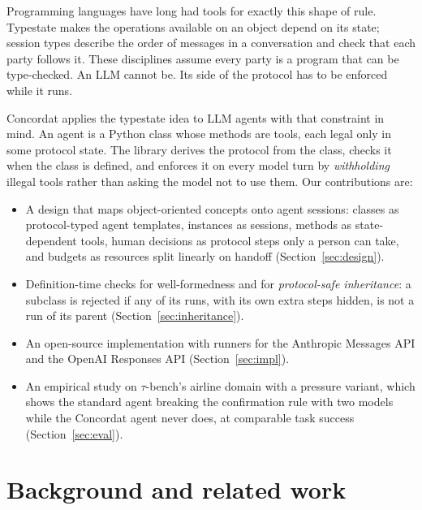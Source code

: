 \documentclass[11pt]{article}
\begin{document}
Programming languages have long had tools for exactly this shape of rule. Typestate
\citep{strom1986typestate} makes the operations available on an object depend on its
state; session types \citep{honda1993types,honda1998language,honda2008multiparty}
describe the order of messages in a conversation and check that each party follows it.
These disciplines assume every party is a program that can be type-checked. An LLM
cannot be. Its side of the protocol has to be enforced while it runs.

Concordat applies the typestate idea to LLM agents with that constraint in mind. An
agent is a Python class whose methods are tools, each legal only in some protocol
state. The library derives the protocol from the class, checks it when the class is
defined, and enforces it on every model turn by \emph{withholding} illegal tools rather
than asking the model not to use them. Our contributions are:

\begin{itemize}
\item A design that maps object-oriented concepts onto agent sessions: classes as
  protocol-typed agent templates, instances as sessions, methods as state-dependent
  tools, human decisions as protocol steps only a person can take, and budgets as
  resources split linearly on handoff (Section~\ref{sec:design}).
\item Definition-time checks for well-formedness and for \emph{protocol-safe
  inheritance}: a subclass is rejected if any of its runs, with its own extra steps
  hidden, is not a run of its parent (Section~\ref{sec:inheritance}).
\item An open-source implementation with runners for the Anthropic Messages API and the
  OpenAI Responses API (Section~\ref{sec:impl}).
\item An empirical study on $\tau$-bench's airline domain with a pressure variant, which
  shows the standard agent breaking the confirmation rule with two models while the
  Concordat agent never does, at comparable task success (Section~\ref{sec:eval}).
\end{itemize}

\section{Background and related work}
\label{sec:related}
\end{document}
